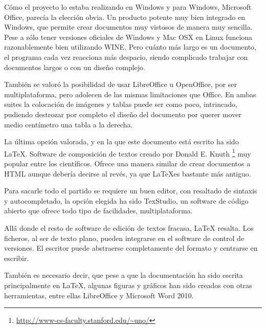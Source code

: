 C\'{o}mo el proyecto lo estaba realizando en Windows y para Windows, Microsoft Office, parec\'{i}a la elecci\'{o}n obvia. Un 
producto potente muy bien integrado
en Windows, que permite crear documentos muy vistosos de manera muy sencilla. 
Pese a s\'olo tener versiones oficiales de Windows y Mac OSX en Linux
funciona razonablemente bien utilizando WINE. Pero cu\'anto m\'as largo es un documento, el programa cada vez reacciona
m\'as despacio, siendo complicado trabajar con documentos largos o con un dise\~no complejo.

Tambi\'en se valor\'o la posibilidad de usar LibreOffice u OpenOffice, por ser multiplataforma, pero adolecen
de las mismas limitaciones que Office. En ambas suites la colocaci\'on de im\'agenes y tablas puede ser como poco,
intrincado, pudiendo destrozar por completo el dise\~no del documento por querer mover medio cent\'imetro una tabla a la
derecha.

La \'ultima opci\'on valorada, y en la que este documento est\'a escrito ha sido \LaTeX.
Software de composici\'{o}n de textos creado por Donald E. Knuth \footnote{\url{http://www-cs-faculty.stanford.edu/~uno/}} 
muy popular entre los cient\'{i}ficos. Ofrece una manera similar de crear documentos a HTML 
aunque deber\'{i}a decirse al rev\'{e}s, ya que \LaTeX es bastante m\'as antiguo.

Para sacarle todo el partido se requiere un buen editor, con resaltado de sintaxis y autocompletado, 
la opci\'on elegida ha sido TexStudio, un
software de c\'{o}digo abierto que ofrece todo tipo de facilidades, multiplataforma.

All\'a donde el resto de software de edici\'on de textos fracasa, LaTeX resalta. Los ficheros, al ser de texto plano,
pueden integrarse en el software de control de versiones. El escritor puede abstraerse completamente del formato
y centrarse en escribir.

Tambi\'en es necesario decir, que pese a que la documentaci\'on ha sido escrita principalmente en LaTeX, algunas figuras
y gr\'aficos han sido creados con otras herramientas, entre ellas LibreOffice y Microsoft Word 2010.
